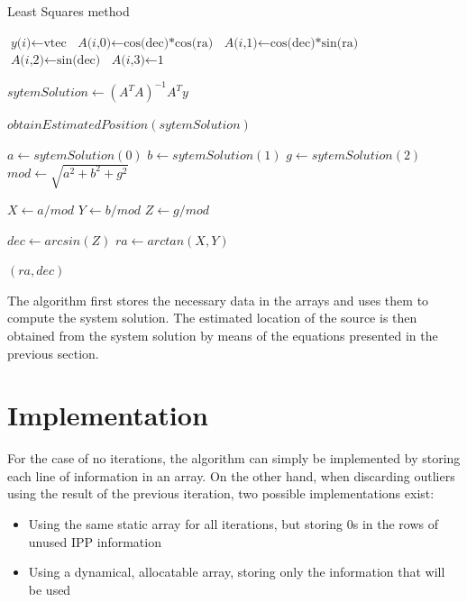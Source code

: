 \begin{algorithm}
	\caption{Least Squares method}\label{leastSquaresPseudo}
	\begin{algorithmic}[1]
		
		\State $\textit{y(i)} \gets \text{vtec}$
		\State $\textit{A(i,0)} \gets \text{cos(dec)*cos(ra)}$
		\State $\textit{A(i,1)} \gets \text{cos(dec)*sin(ra)}$
		\State $\textit{A(i,2)} \gets \text{sin(dec)}$
		\State $\textit{A(i,3)} \gets \text{1}$
		\EndFor
		
		\State $\textit{sytemSolution} \gets (A^{T}A)^{-1}A^{T}y$
		
		\Return $obtainEstimatedPosition(sytemSolution)$
		\EndProcedure

			\State $\textit{a} \gets sytemSolution(0)$
			\State $\textit{b} \gets sytemSolution(1)$
			\State $\textit{g} \gets sytemSolution(2)$
			\State $\textit{mod} \gets \sqrt{a^{2} + b^{2} + g^{2}}$ 
			
			
			\State $\textit{X} \gets a/mod$
			\State $\textit{Y} \gets b/mod$
			\State $\textit{Z} \gets g/mod$
			
			\State $\textit{dec} \gets arcsin(Z)$
			\State $\textit{ra} \gets arctan(X,Y)$
			
			\Return $(ra, dec)$
		\EndProcedure
	\end{algorithmic}
\end{algorithm}

The algorithm first stores the necessary data in the arrays and uses them to compute the system solution. The estimated location of the source is then obtained from the system solution by means of the equations presented in the previous section.

\clearpage

\section{Implementation}

For the case of no iterations, the algorithm can simply be implemented by storing each line of information in an array. On the other hand, when discarding outliers using the result of the previous iteration, two possible implementations exist:

\begin{itemize}
	\item Using the same static array for all iterations, but storing 0s in the rows of unused IPP information
	\item Using a dynamical, allocatable array, storing only the information that will be used
\end{itemize}

